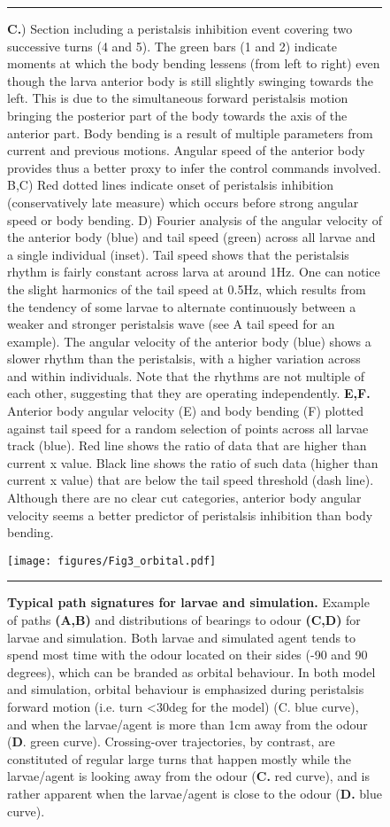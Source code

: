 \documentclass[10pt,a4paper]{article}
\begin{document}
\begin{figure}[t!]
\ContinuedFloat
\caption{
{\bf C.}) Section including a peristalsis inhibition event covering two successive turns (4 and 5). The green bars (1 and 2) indicate moments at which the body bending lessens (from left to right) even though the larva anterior body is still slightly swinging towards the left. This is due to the simultaneous forward peristalsis motion bringing the posterior part of the body towards the axis of the anterior part. Body bending is a result of multiple parameters from current and previous motions. Angular speed of the anterior body provides thus a better proxy to infer the control commands involved. B,C) Red dotted lines indicate onset of peristalsis inhibition (conservatively late measure) which occurs before strong angular speed or body bending. D) Fourier analysis of the angular velocity of the anterior body (blue) and tail speed (green) across all larvae and a single individual (inset). Tail speed shows that the peristalsis rhythm is fairly constant across larva at around 1Hz. One can notice the slight harmonics of the tail speed at 0.5Hz, which results from the tendency of some larvae to alternate continuously between a weaker and stronger peristalsis wave (see A tail speed for an example). The angular velocity of the anterior body (blue) shows a slower rhythm than the peristalsis, with a higher variation across and within individuals. Note that the rhythms are not multiple of each other, suggesting that they are operating independently.
{\bf  E,F.} Anterior body angular velocity (E) and body bending (F) plotted against tail speed for a random selection of points across all larvae track (blue). Red line shows the ratio of data that are higher than current x value. Black line shows the ratio of such data (higher than current x value) that are below the tail speed threshold (dash line). Although there are no clear cut categories, anterior body angular velocity seems a better predictor of peristalsis inhibition than body bending.
}
\hrule
\end{figure}


\begin{figure}[!ht]
\begin{center}
\texttt{[image: figures/Fig3\_orbital.pdf]}
\caption{{\bf Typical path signatures for larvae and simulation.} Example of paths {\bf (A,B)} and distributions of bearings to odour {\bf (C,D)} for larvae and simulation. Both larvae and simulated agent tends to spend most time with the odour located on their sides (-90 and 90 degrees), which can be branded as orbital behaviour. In both model and simulation, orbital behaviour is emphasized during peristalsis forward motion (i.e. turn <30deg for the model) (C. blue curve), and when the larvae/agent is more than 1cm away from the odour ({\bf D}. green curve). Crossing-over trajectories, by contrast, are constituted of regular large turns that happen mostly while the larvae/agent is looking away from the odour ({\bf C.} red curve), and is rather apparent when the larvae/agent is close to the odour ({\bf D.} blue curve).
\label{fig:Fig3}}
\hrule
\end{center}
\end{figure}
\end{document}
